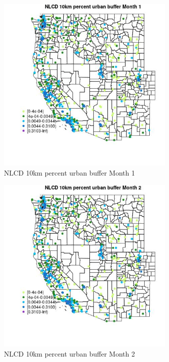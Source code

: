 \begin{figure} 
\centering  
\includegraphics[width=0.77\textwidth]{Code_Outputs/Report_ML_input_PM25_Step4_part_e_de_duplicated_aves_compiled_2019-05-14wNAs_MapObsMo1NLCD_10km_percent_urban_buffer.jpg} 
\caption{\label{fig:Report_ML_input_PM25_Step4_part_e_de_duplicated_aves_compiled_2019-05-14wNAsMapObsMo1NLCD_10km_percent_urban_buffer}NLCD 10km percent urban buffer Month 1} 
\end{figure} 
 

\begin{figure} 
\centering  
\includegraphics[width=0.77\textwidth]{Code_Outputs/Report_ML_input_PM25_Step4_part_e_de_duplicated_aves_compiled_2019-05-14wNAs_MapObsMo2NLCD_10km_percent_urban_buffer.jpg} 
\caption{\label{fig:Report_ML_input_PM25_Step4_part_e_de_duplicated_aves_compiled_2019-05-14wNAsMapObsMo2NLCD_10km_percent_urban_buffer}NLCD 10km percent urban buffer Month 2} 
\end{figure} 
 

